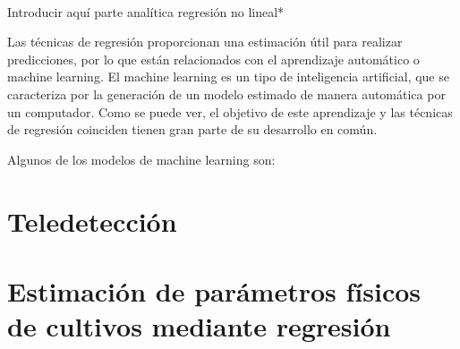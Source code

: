 \\
\par *Introducir aquí parte analítica regresión no lineal*
\\
\par Las técnicas de regresión proporcionan una estimación útil para realizar predicciones, por lo que están relacionados con el aprendizaje automático o machine learning. El machine learning es un tipo de inteligencia artificial, que se caracteriza por la generación de un modelo estimado de manera automática por un computador. Como se puede ver, el objetivo de este aprendizaje y las técnicas de regresión coinciden tienen gran parte de su desarrollo en común. 
\\
\par Algunos de los modelos de machine learning son: 
\section{Teledetección}
\section{Estimación de parámetros físicos de cultivos mediante regresión}
 